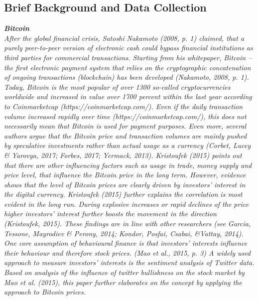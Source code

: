 \documentclass[a4paper,american,12pt]{article}
\begin{document}
\begin{spacing}{1.2}
		\section{Brief Background and Data Collection}
		\itshape\textbf {Bitcoin}\\
		\textnormal {After the global financial crisis, Satoshi Nakamoto (2008, p. 1) claimed, that a purely peer-to-peer version of electronic cash could bypass financial institutions as third parties for commercial transactions. Starting from his whitepaper, Bitcoin – the first electronic payment system that relies on the cryptographic concatenation of ongoing transactions (blockchain) has been developed (Nakamoto, 2008, p. 1).\newline
Today, Bitcoin is the most popular of over 1300 so-called cryptocurrencies worldwide and increased in value over 1700 percent within the last year according to Coinmarketcap (https://coinmarketcap.com/). Even if the daily transaction volume increased rapidly over time (https://coinmarketcap.com/), this does not necessarily mean that Bitcoin is used for payment purposes. Even more, several authors argue that the Bitcoin price and transaction volumes are mainly pushed by speculative investments rather than actual usage as a currency (Corbet, Lucey \& Yarovya, 2017; Forbes, 2017; Yermack, 2013). Kristoufek (2015) points out that there are other influencing factors such as usage in trade, money supply and price level, that influence the Bitcoin price in the long term. However, evidence shows that the level of Bitcoin prices are clearly driven by investors’ interest in the digital currency. Kristoufek (2015) further explains the correlation is most evident in the long run.  During explosive increases or rapid declines of the price higher investors’ interest further boosts the movement in the direction (Kristoufek, 2015). These findings are in line with other researchers (see Garcia, Tessone, Mayrodiev \& Perony, 2014; Kondor, Posfai, Csabai, \&Vattay, 2014).\newline
One core assumption of behavioural finance is that investors’ interests influence their behaviour and therefore stock prices. (Mao et al., 2015, p. 3) A widely used approach to measure investors’ interests is the sentiment analysis of Twitter data. Based on analysis of the influence of twitter bullishness on the stock market by Mao et al. (2015), this paper further elaborates on the concept by applying the approach to Bitcoin prices.
 }\\
		

\end{spacing}
\end{document}
